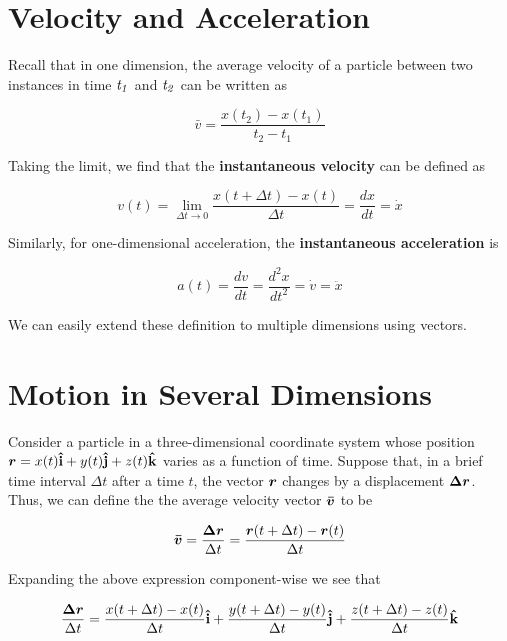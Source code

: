 \documentclass[openany,oneside]{book}
\begin{document}
\section{Velocity and Acceleration}

Recall that in one dimension, the average velocity of a particle between two instances in time $\it{t_1}$ and $\it{t_2}$  can be written as 

$$ \bar{v} = \frac{x(t_2) - x(t_1)}{t_2 - t_1} $$

Taking the limit, we find that the \textbf{instantaneous velocity} can be defined as

\begin{definition}

    $$ v(t) = \lim_{\Delta t \rightarrow 0}{\frac{x(t + \Delta t) - x(t)}{\Delta t}} = \frac{dx}{dt} = \dot{x}$$
    
\end{definition}

Similarly, for one-dimensional acceleration, the \textbf{instantaneous acceleration} is 

\begin{definition}
    $$ a(t) = \frac{dv}{dt} = \frac{d^2 x}{dt^2} = \dot{v} = \ddot{x}$$
\end{definition}

We can easily extend these definition to multiple dimensions using vectors. 

\section{Motion in Several Dimensions}

Consider a particle in a three-dimensional coordinate system whose position $\bm{r} = x(t) \boldsymbol{\hat{\textbf{i}}} + y(t) \boldsymbol{\hat{\textbf{j}}} + z(t) \boldsymbol{\hat{\textbf{k}}} $ varies as a function of time. Suppose that, in a brief time interval $\Delta t$ after a time $t$, the vector $\bm{r}$ changes by a displacement $\bm{\Delta r}$. Thus, we can define the the average velocity vector $\bm{\bar{v}}$ to be 

$$ \bm{\bar{v}} =  \frac{\bm{\Delta r}}{\Delta t} = \frac{\bm{r}(t + \Delta t) - \bm{r}(t)}{\Delta t}$$

Expanding the above expression component-wise we see that

$$  \frac{\bm{\Delta r}}{\Delta t} =
\frac{x(t+\Delta t) - x(t)}{\Delta t} \boldsymbol{\hat{\textbf{i}}} +  \\
\frac{y(t+\Delta t) - y(t)}{\Delta t} \boldsymbol{\hat{\textbf{j}}} + \\ 
\frac{z(t+\Delta t) - z(t)}{\Delta t} \boldsymbol{\hat{\textbf{k}}}
$$
\end{document}
